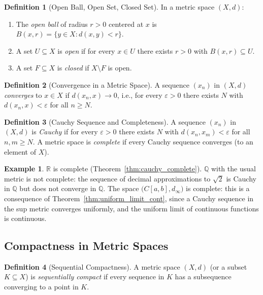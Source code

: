 \documentclass[11pt,a4paper]{article}
\theoremstyle{definition}
\newtheorem{definition}{Definition}[section]
\newtheorem{example}{Example}[section]
\theoremstyle{plain}
\theoremstyle{remark}
\newcommand{\R}{\mathbb{R}}
\newcommand{\Q}{\mathbb{Q}}
\begin{document}
\begin{definition}[Open Ball, Open Set, Closed Set]
\label{def:metric_open}
In a metric space $(X, d)$:
\begin{enumerate}[nosep,label=(\roman*)]
    \item The \emph{open ball} of radius $r > 0$ centered at $x$ is
    $B(x, r) = \{y \in X : d(x, y) < r\}$.
    \item A set $U \subseteq X$ is \emph{open} if for every $x \in U$ there exists
    $r > 0$ with $B(x, r) \subseteq U$.
    \item A set $F \subseteq X$ is \emph{closed} if $X \setminus F$ is open.
\end{enumerate}
\end{definition}

\begin{definition}[Convergence in a Metric Space]
\label{def:metric_convergence}
A sequence $(x_n)$ in $(X, d)$ \emph{converges} to $x \in X$ if
$d(x_n, x) \to 0$, i.e., for every $\varepsilon > 0$ there exists $N$ with
$d(x_n, x) < \varepsilon$ for all $n \ge N$.
\end{definition}

\begin{definition}[Cauchy Sequence and Completeness]
\label{def:metric_complete}
A sequence $(x_n)$ in $(X, d)$ is \emph{Cauchy} if for every $\varepsilon > 0$
there exists $N$ with $d(x_n, x_m) < \varepsilon$ for all $n, m \ge N$.
A metric space is \emph{complete} if every Cauchy sequence converges (to an element
of $X$).
\end{definition}

\begin{example}
\label{ex:complete_spaces}
$\R$ is complete (Theorem~\ref{thm:cauchy_complete}). $\Q$ with the usual metric
is not complete: the sequence of decimal approximations to $\sqrt{2}$ is Cauchy
in $\Q$ but does not converge in $\Q$. The space $\bigl(C[a,b], d_\infty\bigr)$
is complete: this is a consequence of Theorem~\ref{thm:uniform_limit_cont}, since a
Cauchy sequence in the sup metric converges uniformly, and the uniform limit of
continuous functions is continuous.
\end{example}

\subsection{Compactness in Metric Spaces}
\label{subsec:metric_compact}

\begin{definition}[Sequential Compactness]
\label{def:seq_compact}
A metric space $(X, d)$ (or a subset $K \subseteq X$) is \emph{sequentially
compact} if every sequence in $K$ has a subsequence converging to a point in $K$.
\end{definition}
\end{document}

